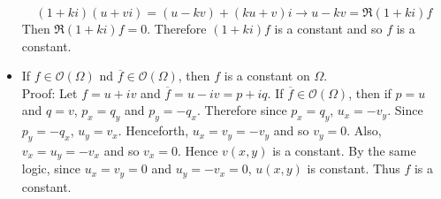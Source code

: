\documentclass[12pt]{article}
\begin{document}
\begin{itemize}
$$(1 + ki)(u + vi) = (u - kv) + (ku + v)i \to u - kv = \Re{(1 + ki)f} $$ 
Then $\Re{(1 + ki)f} = 0$. Therefore $(1 + ki)f$ is a constant and so $f$ is a constant. 
\item If $f \in \mathcal{O}(\Omega)$ nd $\overline{f} \in \mathcal{O}(\Omega)$, then $f$ is a constant on $\Omega$. \\
Proof: Let $f = u + iv$ and $\overline{f} = u - iv = p + iq$. If $\overline{f} \in \mathcal{O}(\Omega)$, then if $p = u$ and $q = v$, $p_x = q_y$ and $p_y = -q_x$. Therefore since $p_x = q_y$, $u_x = -v_y$. Since $p_y = -q_x$, $u_y = v_x$. Henceforth, $u_x = v_y = -v_y$ and so $v_y = 0$. Also, $v_x = u_y = -v_x$ and so $v_x = 0$. Hence $v(x,y)$ is a constant. By the same logic, since $u_x = v_y = 0$ and $u_y = -v_x = 0$, $u(x,y)$ is constant. Thus $f$ is a constant. 
\end{itemize} 
\end{document}
